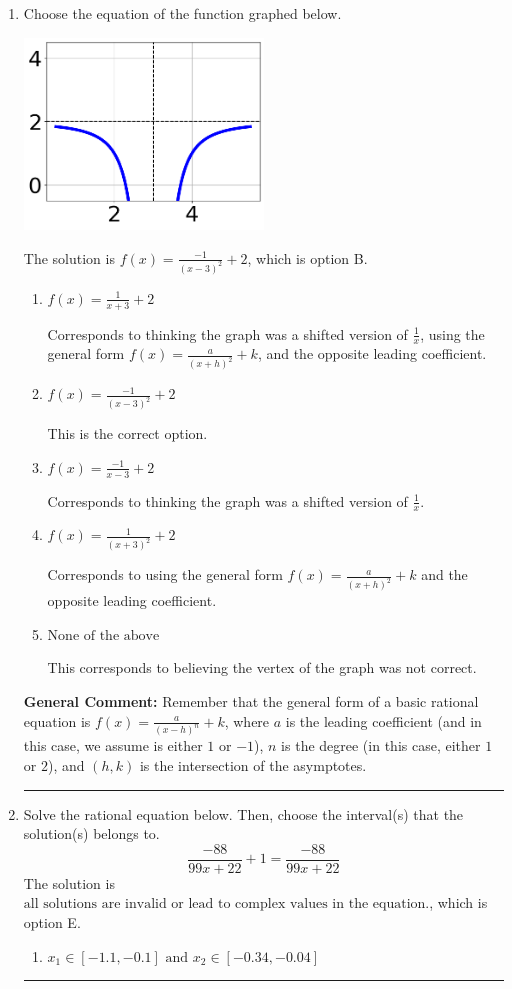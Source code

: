 \documentclass{extbook}[14pt]
\newcommand{\litem}[1]{\item #1

\rule{\textwidth}{0.4pt}}
\begin{document}
\begin{enumerate}\litem{
Choose the equation of the function graphed below.

\begin{center}
    \includegraphics[width=0.5\textwidth]{../Figures/rationalGraphToEquationCopyA.png}
\end{center}


The solution is \( f(x) = \frac{-1}{(x - 3)^2} + 2 \), which is option B.\begin{enumerate}[label=\Alph*.]
\item \( f(x) = \frac{1}{x + 3} + 2 \)

Corresponds to thinking the graph was a shifted version of $\frac{1}{x}$, using the general form $f(x) = \frac{a}{(x+h)^2}+k$, and the opposite leading coefficient.
\item \( f(x) = \frac{-1}{(x - 3)^2} + 2 \)

This is the correct option.
\item \( f(x) = \frac{-1}{x - 3} + 2 \)

Corresponds to thinking the graph was a shifted version of $\frac{1}{x}$.
\item \( f(x) = \frac{1}{(x + 3)^2} + 2 \)

Corresponds to using the general form $f(x) = \frac{a}{(x+h)^2}+k$ and the opposite leading coefficient.
\item \( \text{None of the above} \)

This corresponds to believing the vertex of the graph was not correct.
\end{enumerate}

\textbf{General Comment:} Remember that the general form of a basic rational equation is $ f(x) = \frac{a}{(x-h)^n} + k$, where $a$ is the leading coefficient (and in this case, we assume is either $1$ or $-1$), $n$ is the degree (in this case, either $1$ or $2$), and $(h, k)$ is the intersection of the asymptotes.
}
\litem{
Solve the rational equation below. Then, choose the interval(s) that the solution(s) belongs to.
\[ \frac{-88}{99x + 22} + 1 = \frac{-88}{99x + 22} \]The solution is \( \text{all solutions are invalid or lead to complex values in the equation.} \), which is option E.\begin{enumerate}[label=\Alph*.]
\item \( x_1 \in [-1.1, -0.1] \text{ and } x_2 \in [-0.34,-0.04] \)


\end{enumerate}}
\end{enumerate}
\end{document}
